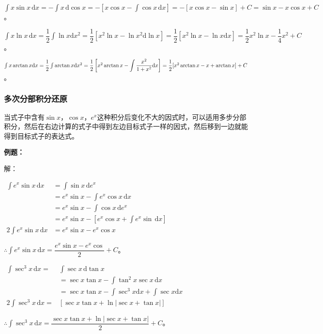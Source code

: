 \documentclass[UTF8, 12pt]{ctexart}
\begin{document}
$\int x\sin x\,\textrm{d}x=-\int x\,\textrm{d}\cos x=-[x\cos x-\int\cos x\,\textrm{d}x]=-[x\cos x-\sin x]+C=\sin x-x\cos x+C$。

$\int x\ln x\,\textrm{d}x=\dfrac{1}{2}\int\ln x\textrm{d}x^2=\dfrac{1}{2}[x^2\ln x-\ln x^2\textrm{d}\ln x]=\dfrac{1}{2}[x^2\ln x-\ln x\textrm{d}x]=\dfrac{1}{2}x^2\ln x-\dfrac{1}{4}x^2+C$。

$\int x\arctan x\textrm{d}x=\dfrac{1}{2}\int\arctan x\textrm{d}x^2=\dfrac{1}{2}\left[x^2\arctan x-\displaystyle{\int\dfrac{x^2}{1+x^2}\textrm{d}x}\right]=\\ \dfrac{1}{2}[x^2\arctan x-x+\arctan x]+C$。

\subsubsection{多次分部积分还原}

当式子中含有$\sin x$，$\cos x$，$e^x$这种积分后变化不大的因式时，可以适用多步分部积分，然后在右边计算的式子中得到左边目标式子一样的因式，然后移到一边就能得到目标式子的表达式。

\textbf{例题：}\medskip

解：

$
\begin{aligned}
    \int e^x\sin x\,\textrm{d}x & =\int\sin x\,\textrm{d}e^x \\
    & =e^x\sin x-\int e^x\cos x\,\textrm{d}x \\
    & =e^x\sin x-\int\cos x\,\textrm{d}e^x \\
    & =e^x\sin x-\left[e^x\cos x+\int e^x\sin\,\textrm{d}x\right] \\
    2\int e^x\sin x\,\textrm{d}x & =e^x\sin x-e^x\cos x
\end{aligned}
$

$\therefore\int e^x\sin x\,\textrm{d}x=\dfrac{e^x\sin x-e^x\cos}{2}+C$。

$
\begin{aligned}
    \int\sec^3x\,\textrm{d}x =&\int\sec x\,\textrm{d}\tan x \\
    & =\sec x\tan x-\int\tan^2x\sec x\,\textrm{d}x \\
    & =\sec x\tan x-\int\sec^3x\textrm{d}x+\int\sec x\textrm{d}x \\
    2\int\sec^3x\,\textrm{d}x =&[\sec x\tan x+\ln\vert\sec x+\tan x\vert]
\end{aligned}
$

$\therefore\int\sec^3x\,\textrm{d}x =\dfrac{\sec x\tan x+\ln\vert\sec x+\tan x\vert}{2}+C$。
\end{document}
